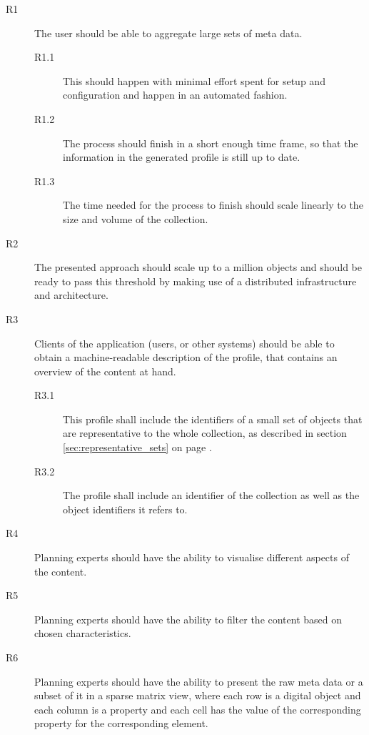 \begin{description}
\item[R1] The user should be able to aggregate large sets of meta data.
\begin{description}
\item[R1.1] This should happen with minimal effort spent for setup and configuration and happen in an automated fashion.
\item[R1.2] The process should finish in a short enough time frame, so that the information in the generated profile is
still up to date.
\item[R1.3] The time needed for the process to finish should scale linearly to the size and volume of the collection.
\end{description}
\item[R2] The presented approach should scale up to a million objects and should be ready to pass this threshold by making use of a distributed infrastructure and architecture.
\item[R3] Clients of the application (users, or other systems) should be able to obtain a machine-readable description of the profile, that contains an overview of the content at hand.
\begin{description}
\item[R3.1] This profile shall include the identifiers of a small set of objects that are representative to the whole collection, as described in section \ref{sec:representative_sets} on page \pageref{sec:representative_sets}.
\item[R3.2] The profile shall include an identifier of the collection as well as the object identifiers it refers to.
\end{description}
\item[R4] Planning experts should have the ability to visualise different aspects of the content.
\item[R5] Planning experts should have the ability to filter the content based on chosen characteristics.
\item[R6] Planning experts should have the ability to present the raw meta data or a subset of it in a sparse matrix view, where each row is a digital object and each column is a property and each cell has the value of the corresponding property for the corresponding element.
\end{description}


